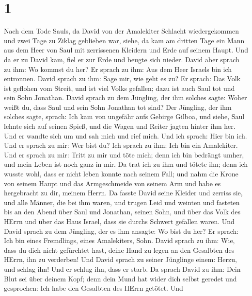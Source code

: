 \hypertarget{section}{%
\section{1}\label{section}}

 Nach dem Tode Sauls, da David von der Amalekiter Schlacht
wiedergekommen und zwei Tage zu Ziklag geblieben war, 
siehe, da kam am dritten Tage ein Mann aus dem Heer von Saul mit
zerrissenen Kleidern und Erde auf seinem Haupt. Und da er zu David kam,
fiel er zur Erde und beugte sich nieder.  David aber sprach
zu ihm: Wo kommst du her? Er sprach zu ihm: Aus dem Heer Israels bin ich
entronnen.  David sprach zu ihm: Sage mir, wie geht es zu?
Er sprach: Das Volk ist geflohen vom Streit, und ist viel Volks
gefallen; dazu ist auch Saul tot und sein Sohn Jonathan. 
David sprach zu dem Jüngling, der ihm solches sagte: Woher weißt du,
dass Saul und sein Sohn Jonathan tot sind?  Der Jüngling,
der ihm solches sagte, sprach: Ich kam von ungefähr aufs Gebirge Gilboa,
und siehe, Saul lehnte sich auf seinen Spieß, und die Wagen und Reiter
jagten hinter ihm her.  Und er wandte sich um und sah mich
und rief mich. Und ich sprach: Hier bin ich.  Und er sprach
zu mir: Wer bist du? Ich sprach zu ihm: Ich bin ein Amalekiter.
 Und er sprach zu mir: Tritt zu mir und töte mich; denn ich
bin bedrängt umher, und mein Leben ist noch ganz in mir. 
Da trat ich zu ihm und tötete ihn; denn ich wusste wohl, dass er nicht
leben konnte nach seinem Fall; und nahm die Krone von seinem Haupt und
das Armgeschmeide von seinem Arm und habe es hergebracht zu dir, meinem
Herrn.  Da fasste David seine Kleider und zerriss sie, und
alle Männer, die bei ihm waren,  und trugen Leid und
weinten und fasteten bis an den Abend über Saul und Jonathan, seinen
Sohn, und über das Volk des HErrn und über das Haus Israel, dass sie
durchs Schwert gefallen waren.  Und David sprach zu dem
Jüngling, der es ihm ansagte: Wo bist du her? Er sprach: Ich bin eines
Fremdlings, eines Amalekiters, Sohn.  David sprach zu ihm:
Wie, dass du dich nicht gefürchtet hast, deine Hand zu legen an den
Gesalbten des HErrn, ihn zu verderben!  Und David sprach zu
seiner Jünglinge einem: Herzu, und schlag ihn! Und er schlug ihn, dass
er starb.  Da sprach David zu ihm: Dein Blut sei über
deinem Kopf; denn dein Mund hat wider dich selbst geredet und
gesprochen: Ich habe den Gesalbten des HErrn getötet.  Und
